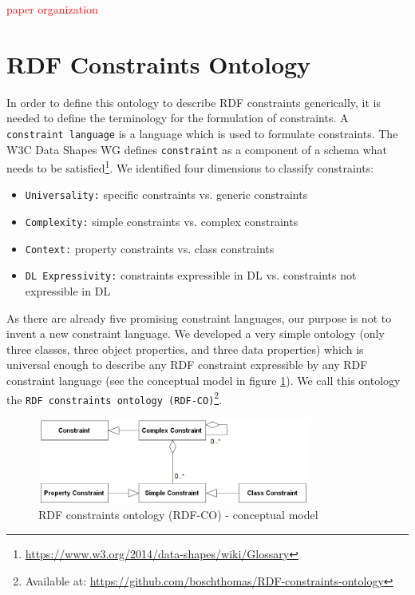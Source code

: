 \documentclass{llncs}
\newcommand{\ms}[1]{\texttt{#1}}
\begin{document}
\textcolor{red}{paper organization}

\section{RDF Constraints Ontology} 
\label{sec:ontology}

In order to define this ontology to describe RDF constraints generically, it is needed to define the terminology for the formulation of constraints. 
A \ms{constraint language} is a language which is used to formulate constraints.
The W3C Data Shapes WG defines \ms{constraint} as a component of a schema what needs to be satisfied\footnote{\url{https://www.w3.org/2014/data-shapes/wiki/Glossary}}.
We identified four dimensions to classify constraints:
\begin{itemize}
  \item \ms{Universality:} specific constraints vs. generic constraints
	\item \ms{Complexity:} simple constraints vs. complex constraints
	\item \ms{Context:} property constraints vs. class constraints
	\item \ms{DL Expressivity:} constraints expressible in DL vs. constraints not expressible in DL
\end{itemize}

As there are already five promising constraint languages, our purpose is not to invent a new constraint language.
We developed a very simple ontology (only three classes, three object properties, and three data properties) which is universal enough to describe any RDF constraint expressible by any RDF constraint language (see the conceptual model in figure \ref{fig:RDF-CO-conceptual-model}).
We call this ontology the \ms{RDF constraints ontology (RDF-CO)}\footnote{Available at: \url{https://github.com/boschthomas/RDF-constraints-ontology}}.

\begin{figure}
	\centering
		\includegraphics[width=0.80\textwidth]{images/RDF-CO-conceptual-model.png}
	\caption{RDF constraints ontology (RDF-CO) - conceptual model}
	\label{fig:RDF-CO-conceptual-model}
\end{figure}
\end{document}

